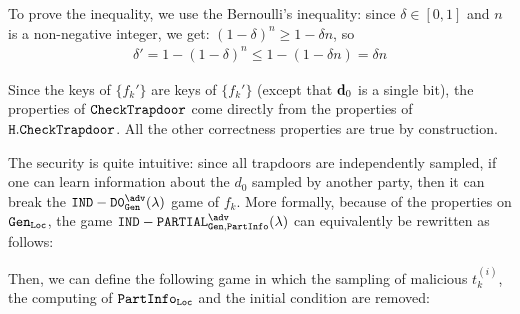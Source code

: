 \begin{proofE}
  To prove the inequality, we use the Bernoulli's inequality: since $\delta \in [0,1]$ and $n$ is a non-negative integer, we get: $(1-\delta)^n \geq 1-\delta n$, so
  \begin{align}
    \delta' = 1-(1-\delta)^n \leq 1-(1-\delta n) = \delta n
  \end{align}

  Since the keys of $\{f_k'\}$ are keys of $\{f_k'\}$ (except that $\mathbf{d}_0$ is a single bit), the properties of ${\tt CheckTrapdoor}$ come directly from the properties of ${\tt H.CheckTrapdoor}$. All the other correctness properties are true by construction.

  The security is quite intuitive: since all trapdoors are independently sampled, if one can learn information about the $d_0$ sampled by another party, then it can break the $\INDFCT_{\Gen{}} ^\adv (\lambda) $ game of $f_k$. More formally, because of the properties on $ {\tt Gen}_{\tt Loc}$, the game $\INDPARTIAL_{\Gen{},\partialInfo{}} ^\adv (\lambda) $ can equivalently be rewritten as follows:
  \begin {pcimage}
    {\normalfont{}}
  \end{pcimage}
  Then, we can define the following game in which the sampling of malicious $t_k^{(i)}$, the computing of ${\tt PartInfo_{\tt Loc}}$ and the initial condition are removed:
  \begin {pcimage}
    {\normalfont{}}
\end{pcimage}
\end{proofE}

